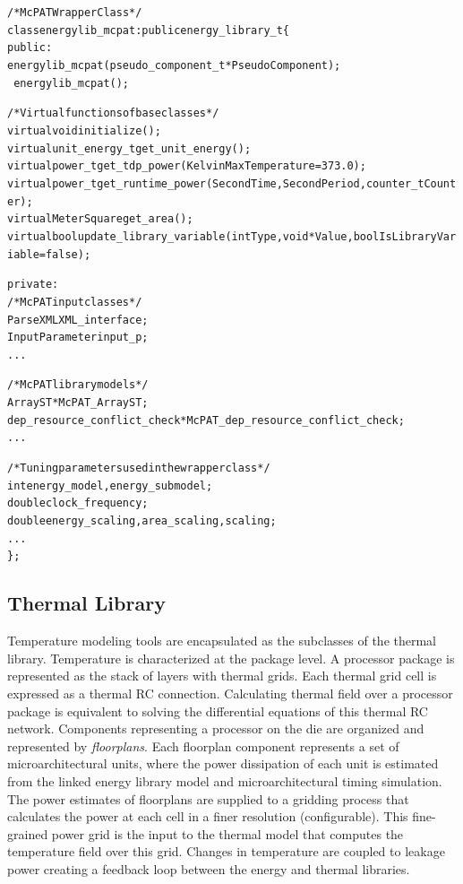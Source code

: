 {
\fontsize{10pt}{11pt}\selectfont
\begin{alltt}
/* McPAT Wrapper Class */
class energylib_mcpat : public energy_library_t \{
public:
    energylib_mcpat(pseudo_component_t *PseudoComponent);
    ~energylib_mcpat();

    /* Virtual functions of base classes */
    virtual void initialize();
    virtual unit_energy_t get_unit_energy();
    virtual power_t get_tdp_power(Kelvin MaxTemperature=373.0);
    virtual power_t get_runtime_power(Second Time, Second Period, counter_t Counter);
    virtual MeterSquare get_area();
    virtual bool update_library_variable(int Type, void *Value, bool IsLibraryVariable=false);

private:
    /* McPAT input classes */
    ParseXML XML_interface;
    InputParameter input_p;
    ...

    /* McPAT library models */
    ArrayST *McPAT_ArrayST;
    dep_resource_conflict_check *McPAT_dep_resource_conflict_check;
    ...

    /* Tuning parameters used in the wrapper class */
    int energy_model, energy_submodel;
    double clock_frequency;
    double energy_scaling, area_scaling, scaling;
    ...
\};
\end{alltt}
}

\subsection{Thermal Library} \label{subsec:thermal_library}
\noindent
Temperature modeling tools are encapsulated as the subclasses of the thermal library.
Temperature is characterized at the package level.
A processor package is represented as the stack of layers with thermal grids.
Each thermal grid cell is expressed as a thermal RC connection.
Calculating thermal field over a processor package is equivalent to solving the differential equations of this thermal RC network.
Components representing a processor on the die are organized and represented by \emph{floorplans}.
Each floorplan component represents a set of microarchitectural units, where the power dissipation of each unit is estimated from the linked energy library model and microarchitectural timing simulation.
The power estimates of floorplans are supplied to a gridding process that calculates the power at each cell in a finer resolution (configurable).
This fine-grained power grid is the input to the thermal model that computes the temperature field over this grid.
Changes in temperature are coupled to leakage power creating a feedback loop between the energy and thermal libraries.


